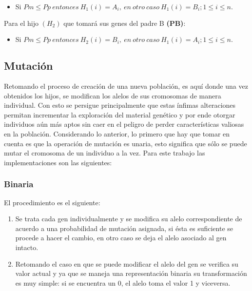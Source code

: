 \documentclass[class=report, crop=false]{standalone}
\begin{document}
\begin{itemize}
\item Si $Pm \leqslant Pp\ entonces\ H_1(i) = A_i,\ en\ otro\ caso\ H_1(i) = B_i; 1 \leqslant i \leqslant n$.
\end{itemize}
Para el hijo \((H_2)\) que tomará sus genes del padre B \textbf{(PB)}:
\begin{itemize}
\item Si $Pm \leqslant Pp\ entonces\ H_2(i) = B_i,\ en\ otro\ caso\ H_1(i) = A_i; 1 \leqslant i \leqslant n$.
\end{itemize}

\subsection{Mutación}
\label{sec:c2_6}
Retomando el proceso de creación de una nueva población, es 
aquí donde una vez obtenidos los hijos, se modifican los alelos 
de sus cromosomas de manera individual.\break
Con esto se persigue principalmente que estas ínfimas alteraciones 
permitan incrementar la exploración del material genético y por 
ende otorgar individuos aún más aptos sin caer en el peligro de 
perder características valiosas en la población.\break
Considerando lo anterior, lo primero que hay que tomar en cuenta 
es que la operación de mutación es unaria, esto significa que 
sólo se puede mutar el cromosoma de un individuo a la vez.\medskip\break
Para este trabajo las implementaciones son las siguientes:

\subsubsection{Binaria}
El procedimiento es el siguiente:

\begin{enumerate}
\item Se trata cada gen individualmente y se modifica su 
alelo correspondiente de acuerdo a una probabilidad de mutación 
asignada, si ésta es suficiente se procede a hacer el cambio, 
en otro caso se deja el alelo asociado al gen intacto.
\item Retomando el caso en que se puede modificar el alelo 
del gen se verifica su valor actual y ya que se maneja una 
representación binaria su transformación es muy simple: si 
se encuentra un 0, el alelo toma el valor 1 y viceversa.
\end{enumerate}
\end{document}
